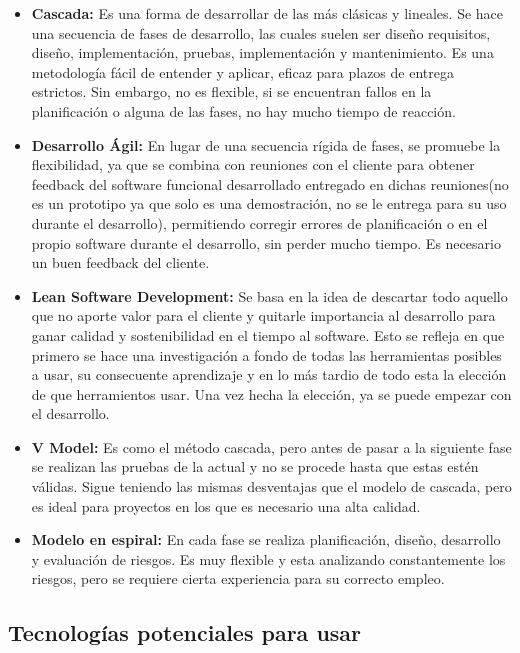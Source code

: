 \begin{itemize}
	\item \textbf{Cascada:} Es una forma de desarrollar de las más clásicas y lineales. Se hace una secuencia de fases de desarrollo, las cuales suelen ser diseño requisitos, diseño, implementación, pruebas, implementación y mantenimiento. Es una metodología fácil de entender y aplicar, eficaz para plazos de entrega estrictos. Sin embargo, no es flexible, si se encuentran fallos en la planificación o alguna de las fases, no hay mucho tiempo de reacción.
	\item \textbf{Desarrollo Ágil:} En lugar de una secuencia rígida de fases, se promuebe la flexibilidad, ya que se combina con reuniones con el cliente para obtener feedback del software funcional desarrollado entregado en dichas reuniones(no es un prototipo ya que solo es una demostración, no se le entrega para su uso durante el desarrollo), permitiendo corregir errores de planificación o en el propio software durante el desarrollo, sin perder mucho tiempo. Es necesario un buen feedback del cliente.
	\item \textbf{Lean Software Development: } Se basa en la idea de descartar todo aquello que no aporte valor para el cliente y quitarle importancia al desarrollo para ganar calidad y sostenibilidad en el tiempo al software. Esto se refleja en que primero se hace una investigación a fondo de todas las herramientas posibles a usar, su consecuente aprendizaje y en lo más tardio de todo esta la elección de que herramientos usar. Una vez hecha la elección, ya se puede empezar con el desarrollo.
	\item \textbf{V Model: } Es como el método cascada, pero antes de pasar a la siguiente fase se realizan las pruebas de la actual y no se procede hasta que estas estén válidas. Sigue teniendo las mismas desventajas que el modelo de cascada, pero es ideal para proyectos en los que es necesario una alta calidad.
	\item \textbf{Modelo en espiral: } En cada fase se realiza planificación, diseño, desarrollo y evaluación de riesgos. Es muy flexible y esta analizando constantemente los riesgos, pero se requiere cierta experiencia para su correcto empleo.
\end{itemize}

\subsection{Tecnologías potenciales para usar}


